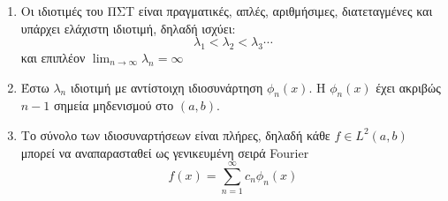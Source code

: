 \documentclass[a4paper,table]{report}
\begin{document}
\begin{enumerate}
  \item Οι ιδιοτιμές του ΠΣΤ είναι πραγματικές, απλές, αριθμήσιμες, διατεταγμένες και 
    υπάρχει ελάχιστη ιδιοτιμή, δηλαδή ισχύει:
    \[
      \lambda _{1} < \lambda _{2} < \lambda _{3} \cdots 
     \]
     και επιπλέον $ \lim_{n \to \infty} \lambda _{n} = \infty $

   \item Έστω $ \lambda _{n} $ ιδιοτιμή με αντίστοιχη ιδιοσυνάρτηση $ \phi _{n}(x) $. 
     Η $ \phi _{n}(x) $ έχει ακριβώς $ n-1 $ σημεία μηδενισμού στο $ (a,b) $.

   \item Το σύνολο των ιδιοσυναρτήσεων είναι πλήρες, δηλαδή κάθε $ f \in L^{2}(a,b) $ 
     μπορεί να αναπαρασταθεί ως γενικευμένη σειρά Fourier 
     \[
       f(x) = \sum_{n=1}^{\infty} c_{n} \phi _{n}(x) 
      \] 



     
\end{enumerate}
\end{document}
